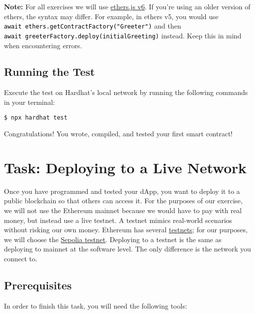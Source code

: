 \documentclass[12pt]{article}
\newcommand{\codegrey}[1]{%
  \texttt{\colorbox{black!4}{\textcolor{black}{#1}}}%
}
\begin{document}
\noindent
\textbf{Note:} For all exercises we will use \href{https://docs.ethers.org/v6/}{ethers.js v6}. If you're using an older version of ethers, the syntax may differ. For example, in ethers v5, you would use \\ \codegrey{await ethers.getContractFactory("Greeter")} and then \\ \codegrey{await greeterFactory.deploy(initialGreeting)} instead. Keep this in mind when encountering errors.

\subsection{Running the Test}

Execute the test on Hardhat's local network by running the following commands
in your terminal:

\begin{verbatim}
$ npx hardhat test
\end{verbatim}
Congratulations! You wrote, compiled, and tested your first smart contract!

\section{Task: Deploying to a Live Network}

Once you have programmed and tested your dApp, you want to deploy it to a
public blockchain so that others can access it. For the purposes of our
exercise, we will not use the Ethereum mainnet because we would have to pay
with real money, but instead use a live testnet. A testnet mimics real-world
scenarios without risking our own money. Ethereum has several
\href{https://ethereum.org/en/developers/docs/networks/#ethereum-testnets}{testnets};
for our purposes, we will choose the \href{https://sepolia.dev/}{Sepolia
    testnet}. Deploying to a testnet is the same as deploying to mainnet at the
software level. The only difference is the network you connect to.

\subsection{Prerequisites}

In order to finish this task, you will need the following tools:
\end{document}
